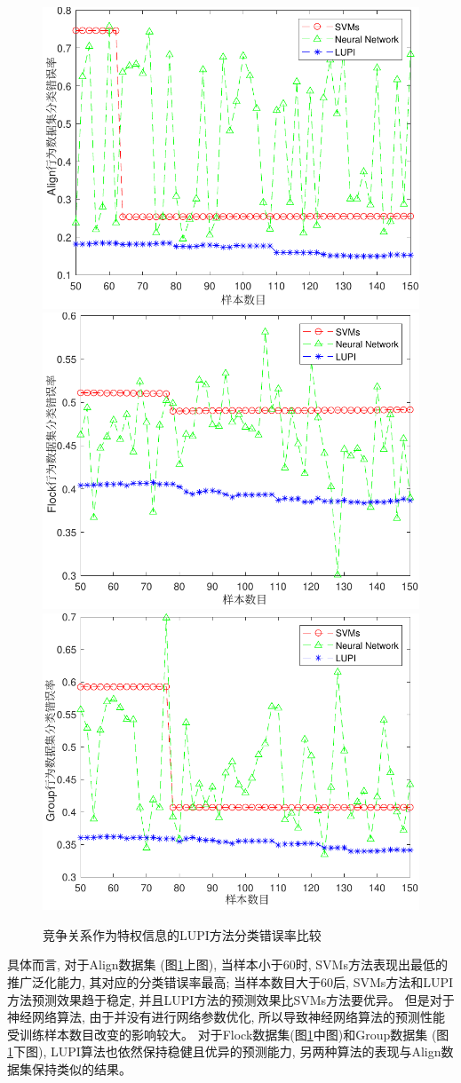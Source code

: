 \begin{figure}
\centering
\includegraphics[width=.7\textwidth]{Img/chapter10/align-sample-PI2.pdf}
\includegraphics[width=.7\textwidth]{Img/chapter10/flock-sample-PI2.pdf}
\includegraphics[width=.7\textwidth]{Img/chapter10/group-sample-PI2.pdf}
\caption{竞争关系作为特权信息的LUPI方法分类错误率比较}
\label{fig:sample-error}
\end{figure}


具体而言, 对于Align数据集 (图\ref{fig:sample-error}上图), 当样本小于60时, SVMs方法表现出最低的推广泛化能力, 其对应的分类错误率最高; 当样本数目大于60后, SVMs方法和LUPI方法预测效果趋于稳定, 并且LUPI方法的预测效果比SVMs方法要优异。 但是对于神经网络算法, 由于并没有进行网络参数优化, 所以导致神经网络算法的预测性能受训练样本数目改变的影响较大。 对于Flock数据集(图\ref{fig:sample-error}中图)和Group数据集 (图\ref{fig:sample-error}下图), LUPI算法也依然保持稳健且优异的预测能力, 另两种算法的表现与Align数据集保持类似的结果。 

